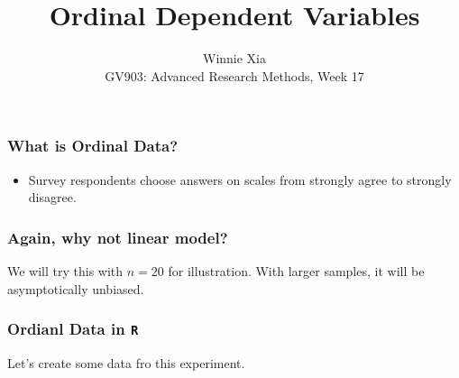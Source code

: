 \documentclass{beamer}\usepackage[]{graphicx}\usepackage[]{xcolor}
\title{Ordinal Dependent Variables}
\author{Winnie Xia \\ \vspace{5mm} \scriptsize GV903: Advanced Research Methods, Week 17}
\begin{document}
\def\solutions{} %



\begin{frame}[plain]
\titlepage
\end{frame}

\begin{frame}
\frametitle{What is Ordinal Data?}
\begin{itemize}
\item Survey respondents choose answers on scales from strongly agree to strongly disagree.
\end{itemize}
\end{frame}

\begin{frame}
\frametitle{Again, why not linear model?}
We will try this with $n = 20$ for illustration. With larger samples, it will be asymptotically unbiased.

\end{frame}


\begin{frame}
\frametitle{Ordianl Data in \texttt{R}}
Let's create some data fro this experiment.

\end{frame}
\end{document}
